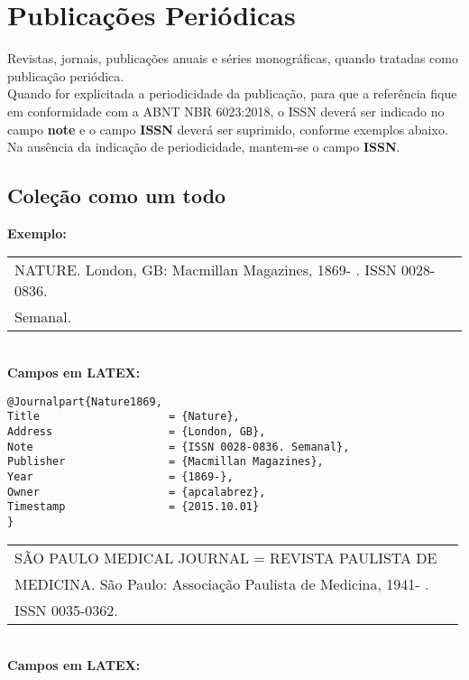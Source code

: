 \section{Publicações Periódicas}

Revistas, jornais, publicações anuais e séries monográficas, quando
tratadas como publicação periódica. \\

Quando for explicitada a periodicidade da publicação, para que a referência fique em conformidade com a ABNT NBR 6023:2018, o ISSN deverá ser indicado no campo \textbf{note} e o campo \textbf{ISSN} deverá ser suprimido, conforme exemplos abaixo. Na ausência da indicação de periodicidade, mantem-se o campo \textbf{ISSN}. \\

\subsection{Coleção como um todo}

\textbf{Exemplo:} \\

\begin{tabular}{|l|c|} \hline
	NATURE. London, GB: Macmillan Magazines, 1869- . ISSN
	0028-0836.\\Semanal.\\\hline
\end{tabular} \\

\textbf{Campos em LATEX:} 

\begin{verbatim}
@Journalpart{Nature1869,
Title                    = {Nature},
Address                  = {London, GB},
Note                     = {ISSN 0028-0836. Semanal},
Publisher                = {Macmillan Magazines},
Year                     = {1869-},
Owner                    = {apcalabrez},
Timestamp                = {2015.10.01}
}
\end{verbatim}

\begin{tabular}{|l|c|} \hline
	SÃO PAULO MEDICAL JOURNAL = REVISTA PAULISTA DE\\MEDICINA.  São Paulo: Associação Paulista de Medicina, 1941- . \\ISSN 0035-0362.\\\hline
\end{tabular} \\

\textbf{Campos em LATEX:} 

